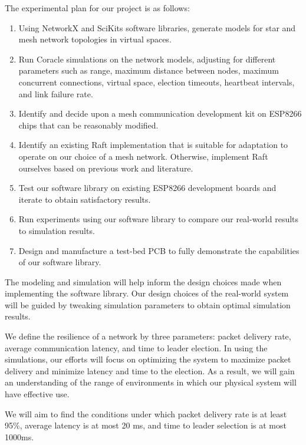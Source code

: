 The experimental plan for our project is as follows:
\begin{enumerate}
    \item Using NetworkX and SciKits software libraries, generate models for star and mesh network topologies in virtual spaces.
    \item Run Coracle simulations on the network models, adjusting for different parameters such as range, maximum distance between nodes, maximum concurrent connections, virtual space, election timeouts, heartbeat intervals, and link failure rate.
    \item Identify and decide upon a mesh communication development kit on ESP8266 chips that can be reasonably modified.
    \item Identify an existing Raft implementation that is suitable for adaptation to operate on our choice of a mesh network. Otherwise, implement Raft ourselves based on previous work and literature.
    \item Test our software library on existing ESP8266 development boards and iterate to obtain satisfactory results.
    \item Run experiments using our software library to compare our real-world results to simulation results.
    \item Design and manufacture a test-bed PCB to fully demonstrate the capabilities of our software library.
\end{enumerate}

The modeling and simulation will help inform the design choices made when implementing the software library. Our design choices of the real-world system will be guided by tweaking simulation parameters to obtain optimal simulation results.

We define the resilience of a network by three parameters: packet delivery rate, average communication latency, and time to leader election. In using the simulations, our efforts will focus on optimizing the system to maximize packet delivery and minimize latency and time to the election. As a result, we will gain an understanding of the range of environments in which our physical system will have effective use.

We will aim to find the conditions under which packet delivery rate is at least 95\%, average latency is at most 20 ms, and time to leader selection is at most 1000ms.
